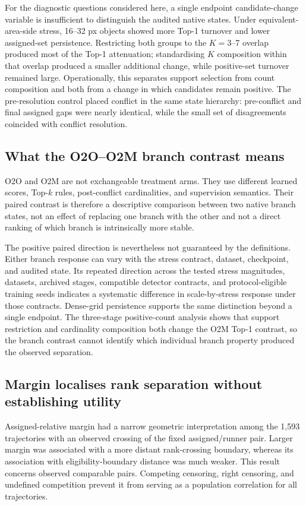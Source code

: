 For the diagnostic questions considered here, a single endpoint candidate-change variable is insufficient to distinguish the audited native states. Under equivalent-area-side stress, 16--32 px objects showed more Top-1 turnover and lower assigned-set persistence. Restricting both groups to the $K=3$--7 overlap produced most of the Top-1 attenuation; standardising $K$ composition within that overlap produced a smaller additional change, while positive-set turnover remained large. Operationally, this separates support selection from count composition and both from a change in which candidates remain positive. The pre-resolution control placed conflict in the same state hierarchy: pre-conflict and final assigned gaps were nearly identical, while the small set of disagreements coincided with conflict resolution.

\subsection{What the O2O--O2M branch contrast means}

O2O and O2M are not exchangeable treatment arms. They use different learned scores, Top-$k$ rules, post-conflict cardinalities, and supervision semantics. Their paired contrast is therefore a descriptive comparison between two native branch states, not an effect of replacing one branch with the other and not a direct ranking of which branch is intrinsically more stable.

The positive paired direction is nevertheless not guaranteed by the definitions. Either branch response can vary with the stress contract, dataset, checkpoint, and audited state. Its repeated direction across the tested stress magnitudes, datasets, archived stages, compatible detector contracts, and protocol-eligible training seeds indicates a systematic difference in scale-by-stress response under those contracts. Dense-grid persistence supports the same distinction beyond a single endpoint. The three-stage positive-count analysis shows that support restriction and cardinality composition both change the O2M Top-1 contrast, so the branch contrast cannot identify which individual branch property produced the observed separation.

\subsection{Margin localises rank separation without establishing utility}

Assigned-relative margin had a narrow geometric interpretation among the 1,593 trajectories with an observed crossing of the fixed assigned/runner pair. Larger margin was associated with a more distant rank-crossing boundary, whereas its association with eligibility-boundary distance was much weaker. This result concerns observed comparable pairs. Competing censoring, right censoring, and undefined competition prevent it from serving as a population correlation for all trajectories.

